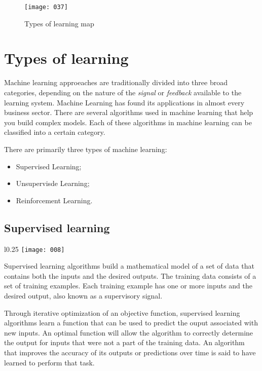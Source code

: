 \begin{figure}[t!]
    \begin{center}
        \texttt{[image: 037]}
    \end{center}
    \caption{Types of learning map}
    \label{fig:037}
\end{figure}

\section{Types of learning}

Machine learning approeaches are traditionally divided into three broad categories, depending on the nature of the \emph{signal} or \emph{feedback} available to the learning system. Machine Learning has found its applications in almost every business sector. There are several algorithms used in machine learning that help you build complex models. Each of these algorithms in machine learning can be classified into a certain category.

There are primarily three types of machine learning:
\begin{itemize}[topsep={0pt}, partopsep={0pt}]
    \item Supervised Learning;
    \item Unsupervisde Learning;
    \item Reinforcement Learning.
\end{itemize}

\subsection{Supervised learning}
\begin{wrapfigure}{l}{0.25\textwidth}
      \texttt{[image: 008]}
\end{wrapfigure}
Supervised learning algorithms build a mathematical model of a set of data that contains both the inputs and the desired outputs. The training data consists of a set of training examples. Each training example has one or more inputs and the desired output, also known as a supervisory signal. 

Through iterative optimization of an objective function, supervised learning algorithms learn a function that can be used to predict the ouput associated with new inputs. An optimal function will allow the algorithm to correctly determine the output for inputs that were not a part of the training data. An algorithm that improves the accuracy of its outputs or predictions over time is said to have learned to perform that task.

